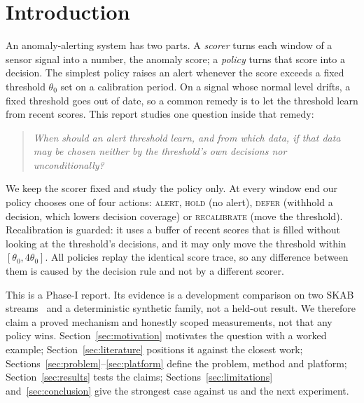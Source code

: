 \section{Introduction}\label{sec:introduction}

An anomaly-alerting system has two parts. A \emph{scorer} turns each window of a
sensor signal into a number, the anomaly score; a \emph{policy} turns that score into
a decision. The simplest policy raises an alert whenever the score exceeds a fixed
threshold $\theta_0$ set on a calibration period. On a signal whose normal level drifts,
a fixed threshold goes out of date, so a common remedy is to let the threshold learn
from recent scores. This report studies one question inside that remedy:

\begin{quote}
\emph{When should an alert threshold learn, and from which data, if that data may be
chosen neither by the threshold's own decisions nor unconditionally?}
\end{quote}

We keep the scorer fixed and study the policy only. At every window end our policy
chooses one of four actions: \textsc{alert}, \textsc{hold} (no alert),
\textsc{defer} (withhold a decision, which lowers decision coverage) or
\textsc{recalibrate} (move the threshold). Recalibration is guarded: it uses a buffer of
recent scores that is filled without looking at the threshold's decisions, and it may
only move the threshold within $[\theta_0, 4\theta_0]$. All policies replay the
identical score trace, so any difference between them is caused by the decision rule
and not by a different scorer.

This is a Phase-I report. Its evidence is a development comparison on two SKAB
streams~\citep{skab2020} and a deterministic synthetic family, not a held-out result.
We therefore claim a proved mechanism and honestly scoped measurements, not that any
policy wins. Section~\ref{sec:motivation} motivates the question with a worked example;
Section~\ref{sec:literature} positions it against the closest work;
Sections~\ref{sec:problem}--\ref{sec:platform} define the problem, method and platform;
Section~\ref{sec:results} tests the claims; Sections~\ref{sec:limitations}
and~\ref{sec:conclusion} give the strongest case against us and the next experiment.
